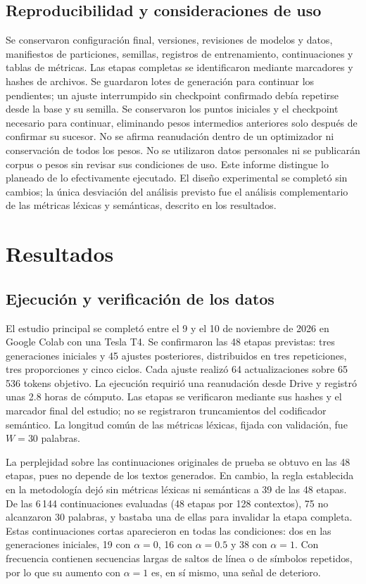 \documentclass[12pt,letterpaper]{article}
\begin{document}
\subsection{Reproducibilidad y consideraciones de uso}

Se conservaron configuración final, versiones, revisiones de modelos y
datos, manifiestos de particiones, semillas, registros de entrenamiento,
continuaciones y tablas de métricas. Las etapas completas se identificaron
mediante marcadores y hashes de archivos. Se guardaron lotes de generación
para continuar los pendientes; un ajuste interrumpido sin checkpoint
confirmado debía repetirse desde la base y su semilla. Se conservaron los
puntos iniciales y el checkpoint necesario para continuar, eliminando pesos
intermedios anteriores solo después de confirmar su sucesor. No se afirma
reanudación dentro de un optimizador ni conservación de todos los pesos.
No se utilizaron datos personales ni se publicarán corpus o pesos sin
revisar sus condiciones de uso. Este informe distingue lo planeado de lo
efectivamente ejecutado. El diseño experimental se completó sin cambios;
la única desviación del análisis previsto fue el análisis complementario
de las métricas léxicas y semánticas, descrito en los resultados.

\section{Resultados}

\subsection{Ejecución y verificación de los datos}

El estudio principal se completó entre el 9 y el 10 de noviembre de 2026
en Google Colab con una Tesla T4. Se confirmaron las 48 etapas previstas:
tres generaciones iniciales y 45 ajustes posteriores, distribuidos en tres
repeticiones, tres proporciones y cinco ciclos. Cada ajuste realizó 64
actualizaciones sobre 65\,536 tokens objetivo. La ejecución requirió una
reanudación desde Drive y registró unas 2.8 horas de cómputo. Las etapas
se verificaron mediante sus hashes y el marcador final del estudio; no
se registraron truncamientos del codificador semántico. La longitud común
de las métricas léxicas, fijada con validación, fue \(W=30\) palabras.

La perplejidad sobre las continuaciones originales de prueba se obtuvo en
las 48 etapas, pues no depende de los textos generados. En cambio, la regla
establecida en la metodología dejó sin métricas léxicas ni semánticas a 39
de las 48 etapas. De las 6\,144 continuaciones evaluadas (48 etapas por 128
contextos), 75 no alcanzaron 30 palabras, y bastaba una de ellas para
invalidar la etapa completa. Estas continuaciones cortas aparecieron en
todas las condiciones: dos en las generaciones iniciales, 19 con
\(\alpha=0\), 16 con \(\alpha=0.5\) y 38 con \(\alpha=1\). Con frecuencia
contienen secuencias largas de saltos de línea o de símbolos repetidos, por
lo que su aumento con \(\alpha=1\) es, en sí mismo, una señal de deterioro.
\end{document}
